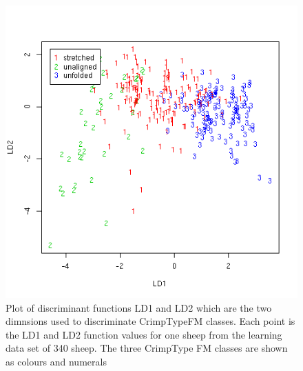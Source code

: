%

\begin{figure}[!h]
  \centering
  \includegraphics[width=1.1\textwidth]{figldaall.png}
  \caption{Plot of discriminant functions LD1 and LD2 which are the two dimnsions used to discriminate CrimpTypeFM classes. Each point is the LD1 and LD2 function values for one sheep from the learning data set of 340 sheep. The three CrimpType FM classes are shown as colours and numerals}
  \label{fig:ldaall}
\end{figure}

%

